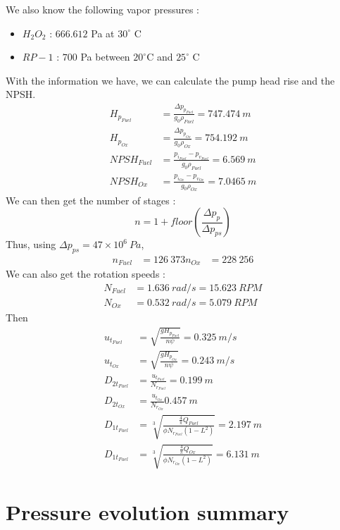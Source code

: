 We also know the following vapor pressures :
\begin{itemize}
	\item $H_2O_2$ : $666.612$ Pa at $30^\circ$ C
	\item $RP-1$ : $700$ Pa between $20^\circ$C and $25^\circ$ C
\end{itemize}
With the information we have, we can calculate the pump head rise and the NPSH.
\begin{align}
	H_{p_{Fuel}} &= \frac{\Delta p_{p_{Fuel}}}{g_0 \rho_{Fuel}} = 747.474\ m\\
	H_{p_{Ox}} &= \frac{\Delta p_{p_{Ox}}}{g_0 \rho_{Ox}} = 754.192\ m\\
	NPSH_{Fuel} &= \frac{p_{i_{Fuel}} - p_{v_{Fuel}}}{g_0 \rho_{Fuel}} = 6.569\ m\\
	NPSH_{Ox} &= \frac{p_{i_{Ox}} - p_{v_{Ox}}}{g_0 \rho_{Ox}} = 7.0465\ m
\end{align}
We can then get the number of stages :
\begin{equation}
	n= 1 +floor(\frac{\Delta p_p}{\Delta p_{ps}})
\end{equation}
Thus, using $\Delta p_{ps} = 47\times 10^6\ Pa$,
\begin{align}
	n_{Fuel} &= 126\ 373
	n_{Ox} &= 228\ 256
\end{align}
We can also get the rotation speeds :
\begin{align}
	N_{Fuel} &= 1.636\ rad/s = 15.623\ RPM\\
	N_{Ox} &= 0.532\ rad/s = 5.079\ RPM
\end{align}
Then
\begin{align}
	u_{t_{Fuel}} &= \sqrt{\frac{gH_{p_{Fuel}}}{n\psi}}=0.325\ m/s\\
	u_{t_{Ox}} &= \sqrt{\frac{gH_{p_{Ox}}}{n\psi}} =0.243\ m/s\\
	D_{2t_{Fuel}} &=\frac{u_{t_{Fuel}}}{N_{r_{Fuel}}}= 0.199\ m\\
	D_{2t_{Ox}} &= \frac{u_{t_{Ox}}}{N_{r_{Ox}}} 0.457\ m\\
	D_{1t_{Fuel}} &= \sqrt[3]{\frac{\frac{4}{\pi}Q_{Fuel}}{\phi N_{r_{Fuel}}(1-L^2)}} = 2.197\ m\\
	D_{1t_{Fuel}} &=\sqrt[3]{\frac{\frac{4}{\pi}Q_{Ox}}{\phi N_{r_{Ox}}(1-L^2)}} = 6.131\ m
\end{align}
\section{Pressure evolution summary}
